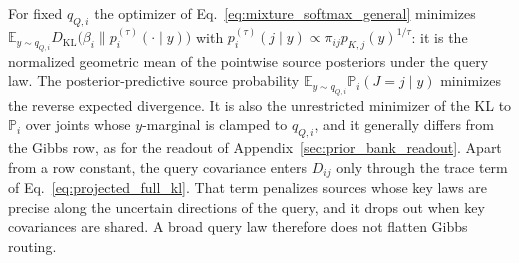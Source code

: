 \documentclass[twoside,11pt]{article}
\begin{document}
For fixed $q_{Q,i}$ the optimizer of Eq.~\eqref{eq:mixture_softmax_general} minimizes $\mathbb E_{y\sim q_{Q,i}}D_{\mathrm{KL}}\bigl(\beta_i\|p_i^{(\tau)}(\cdot\mid y)\bigr)$ with $p_i^{(\tau)}(j\mid y)\propto\pi_{ij}p_{K,j}(y)^{1/\tau}$: it is the normalized geometric mean of the pointwise source posteriors under the query law. The posterior-predictive source probability $\mathbb E_{y\sim q_{Q,i}}\mathbb P_i(J=j\mid y)$ minimizes the reverse expected divergence. It is also the unrestricted minimizer of the KL to $\mathbb P_i$ over joints whose $y$-marginal is clamped to $q_{Q,i}$, and it generally differs from the Gibbs row, as for the readout of Appendix~\ref{sec:prior_bank_readout}. Apart from a row constant, the query covariance enters $D_{ij}$ only through the trace term of Eq.~\eqref{eq:projected_full_kl}. That term penalizes sources whose key laws are precise along the uncertain directions of the query, and it drops out when key covariances are shared. A broad query law therefore does not flatten Gibbs routing.
\end{document}
